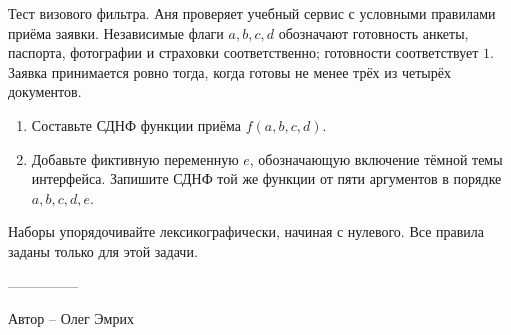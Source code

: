 \question
Тест визового фильтра. Аня проверяет учебный сервис с условными правилами приёма заявки. Независимые флаги $a,b,c,d$ обозначают готовность анкеты, паспорта, фотографии и страховки соответственно; готовности соответствует $1$. Заявка принимается ровно тогда, когда готовы не менее трёх из четырёх документов.
\begin{enumerate}
\item Составьте СДНФ функции приёма $f(a,b,c,d)$.
\item Добавьте фиктивную переменную $e$, обозначающую включение тёмной темы интерфейса. Запишите СДНФ той же функции от пяти аргументов в порядке $a,b,c,d,e$.
\end{enumerate}
Наборы упорядочивайте лексикографически, начиная с нулевого. Все правила заданы только для этой задачи.

---------------

Автор -- Олег Эмрих
